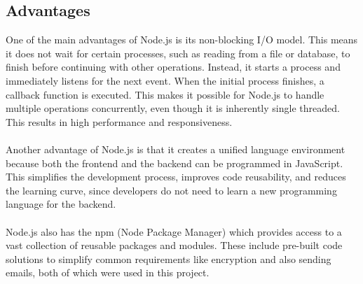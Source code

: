 \documentclass[a4paper,12pt]{report}
\begin{document}
\subsection{Advantages}  
One of the main advantages of Node.js is its non-blocking I/O model. This means it does not wait for certain processes, such as reading from a file or database, to finish before continuing with other operations. Instead, it starts a process and immediately listens for the next event. When the initial process finishes, a callback function is executed. This makes it possible for Node.js to handle multiple operations concurrently, even though it is inherently single threaded. This results in high performance and responsiveness. \parencite{nodejs-nonblocking}\\\\
Another advantage of Node.js is that it creates a unified language environment because both the frontend and the backend can be programmed in JavaScript. This simplifies the development process, improves code reusability, and reduces the learning curve, since developers do not need to learn a new programming language for the backend.\\\\
Node.js also has the npm (Node Package Manager) which provides access to a vast collection of reusable packages and modules. These include pre-built code solutions to simplify common requirements like encryption and also sending emails, both of which were used in this project. \parencite{mdn-express-nodejs} \\ \\
\end{document}
